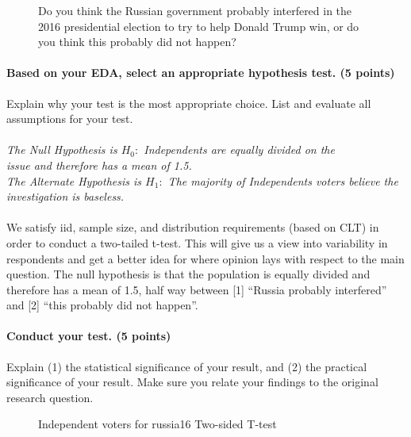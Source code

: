 \documentclass[12pt]{article}
\begin{document}
\begin{figure}[H]
\centering
\scalebox{.5}{
}
\caption{Do you think the Russian government probably interfered in the 2016 presidential election to try to help Donald Trump win, or do you think this probably did not happen?}
\end{figure}

\paragraph{Based on your EDA, select an appropriate hypothesis test. (5 points)}
Explain why your test is the most appropriate choice. List and evaluate all assumptions for your test.

\paragraph{}
\parbox{\textwidth}{\emph{The Null Hypothesis is $H_0:$ Independents are equally divided on the \\ issue and therefore has a mean of 1.5.\\
The Alternate Hypothesis is $H_1:$ The majority of Independents voters believe the investigation is baseless.}}
\paragraph{}

We satisfy iid, sample size, and distribution requirements (based on CLT) in order to conduct a two-tailed t-test. This will give us a view into variability in respondents and get a better idea for where opinion lays with respect to the main question.  The null hypothesis is that the population is equally divided and therefore has a mean of 1.5, half way between [1] “Russia probably interfered” and [2] “this probably did not happen”. 

\paragraph{Conduct your test. (5 points)}
Explain (1) the statistical significance of your result, and (2) the practical significance of your result. Make sure you relate your findings to the original research question.

\begin{figure}[H]
\begin{Schunk}
\end{Schunk}
\caption{Independent voters for russia16 Two-sided T-test}
\end{figure}
\end{document}
